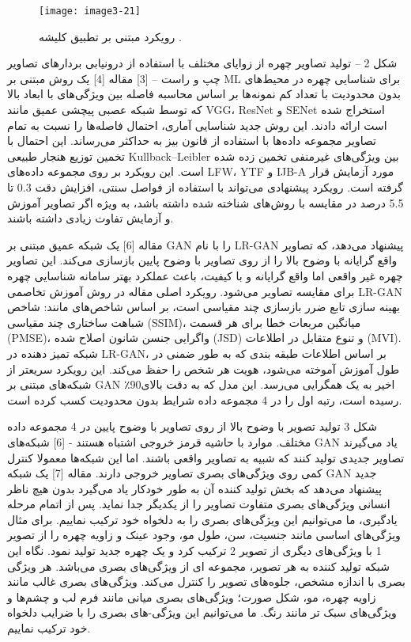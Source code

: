 \begin{figure}[h]
\centering
  \texttt{[image: image3-21]}
  \caption{رویکرد مبتنی بر تطبیق کلیشه  \cite{ref1}.}
  \label{image3-21}
\end{figure}
 
شکل 2 – تولید تصاویر چهره از زوایای مختلف با استفاده از درونیابی بردارهای تصاویر چپ و راست – [3]
مقاله [4] یک روش مبتنی بر ML  برای شناسایی چهره در محیط‌های بدون محدودیت با تعداد کم نمونه‌ها بر اساس محاسبه فاصله بین ویژگی‌های با ابعاد بالا که توسط شبکه عصبی پیچشی عمیق مانند VGG، ResNet و SENet استخراج شده است ارائه دادند. این روش جدید شناسایی آماری، احتمال فاصله‌ها را نسبت به تمام تصاویر مجموعه داده‌ها با استفاده از قانون بیز  به حداکثر می‌رساند. این احتمال با تخمین توزیع هنجار طبیعی Kullback–Leibler بین ویژگی‌های غیرمنفی تخمین زده شده است. این رویکرد بر روی مجموعه داده‌های LFW، YTF  و IJB-A  مورد آزمایش قرار گرفته است. رویکرد پیشنهادی می‌تواند با استفاده از فواصل سنتی، افزایش دقت 0.3 تا 5.5 درصد در مقایسه با روش‌های شناخته شده داشته باشد، به ویژه اگر تصاویر آموزش و آزمایش تفاوت زیادی داشته باشند. 


مقاله [6] یک شبکه عمیق مبتنی بر GAN را با نام LR-GAN پیشنهاد می‌دهد، که تصاویر واقع گرایانه با وضوح بالا را از روی تصاویر با وضوح پایین بازسازی می‌کند. این تصاویر چهره غیر واقعی اما واقع گرایانه و با کیفیت، باعث عملکرد بهتر سامانه شناسایی چهره برای مقایسه تصاویر می‌شود. رویکرد اصلی مقاله در روش آموزش تخاصمی LR-GAN بهینه سازی تابع ضرر بازسازی چند مقیاسی  است، بر اساس شاخص‌های مانند: شاخص شباهت ساختاری چند مقیاسی  (SSIM)، میانگین مربعات خطا برای هر قسمت  (PMSE)، واگرایی جنسن شانون اصلاح شده  (JSD) و تنوع متقابل در اطلاعات  (MVI). 
شبکه تمیز دهنده در LR-GAN، بر اساس اطلاعات طبقه‌ بندی که به طور ضمنی در طول آموزش آموخته می‌شود، هویت هر شخص را حفظ می‌کند. این رویکرد سریعتر از شبکه‌های مبتنی بر GAN اخیر به یک همگرایی می‌رسد. این مدل که به دقت بالای90٪ رسیده است، رتبه اول را در 4 مجموعه داده شرایط بدون محدودیت کسب کرده است.

  شکل ‏3   تولید تصویر با وضوح بالا از روی تصاویر با وضوح پایین در 4 مجموعه داده مختلف. موارد با حاشیه قرمز خروجی‌ اشتباه هستند - [6]
شبکه‌های GAN یاد می‌گیرند تصاویر جدیدی تولید کنند که شبیه به تصاویر واقعی باشند. اما این شبکه‌ها معمولا کنترل کمی روی ویژگی‌های بصری تصاویر خروجی دارند.
مقاله [7] یک شبکه GAN جدید پیشنهاد می‌دهد که بخش تولید کننده آن به طور خودکار یاد می‌گیرد بدون هیچ ناظر انسانی ویژگی‌های بصری متفاوت تصاویر را از یکدیگر جدا نماید. پس از اتمام مرحله یادگیری، ما می‌توانیم این ویژگی‌های بصری را به دلخواه خود ترکیب نماییم. برای مثال ویژگی‌های اساسی مانند جنسیت، سن، طول مو، وجود عینک و زاویه چهره را از تصویر 1 با ویژگی‌های دیگری از تصویر 2 ترکیب کرد و یک چهره جدید تولید نمود. نگاه این شبکه تولید کننده به هر تصویر، مجموعه ای از ویژگی‌های بصری می‌باشد. هر ویژگی بصری با اندازه مشخص، جلوه‌های تصویر را کنترل می‌کند. ویژگی‌های بصری غالب مانند زاویه چهره، مو، شکل صورت؛ ویژگی‌های بصری میانی مانند فرم لب و چشم‌ها و ویژگی‌های سبک تر مانند رنگ. ما می‌توانیم این ویژگی-های بصری را با ضرایب دلخواه خود ترکیب نماییم.
 
